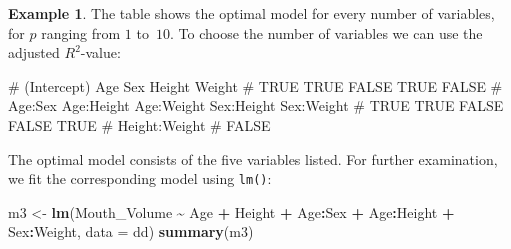 \documentclass[
  a4paper,
]{article}
\newenvironment{Shaded}{\begin{snugshade}}{\end{snugshade}}
\newcommand{\AttributeTok}[1]{\textcolor[rgb]{0.13,0.29,0.53}{#1}}
\newcommand{\FunctionTok}[1]{\textcolor[rgb]{0.13,0.29,0.53}{\textbf{#1}}}
\newcommand{\NormalTok}[1]{#1}
\newcommand{\OtherTok}[1]{\textcolor[rgb]{0.56,0.35,0.01}{#1}}
\newcommand{\SpecialCharTok}[1]{\textcolor[rgb]{0.81,0.36,0.00}{\textbf{#1}}}
\theoremstyle{definition}
\theoremstyle{definition}
\newtheorem{example}{Example}[section]
\theoremstyle{definition}
\theoremstyle{definition}
\theoremstyle{remark}
\begin{document}
\begin{example}
The table shows the optimal model for every number of variables,
for \(p\) ranging from \(1\) to~\(10\). To choose the number of variables
we can use the adjusted \(R^2\)-value:

\begin{Shaded}
\end{Shaded}

\begin{Shaded}
\begin{Highlighting}[]
\NormalTok{\#   (Intercept)           Age           Sex        Height        Weight }
\NormalTok{\#          TRUE          TRUE         FALSE          TRUE         FALSE }
\NormalTok{\#       Age:Sex    Age:Height    Age:Weight    Sex:Height    Sex:Weight }
\NormalTok{\#          TRUE          TRUE         FALSE         FALSE          TRUE }
\NormalTok{\# Height:Weight }
\NormalTok{\#         FALSE}
\end{Highlighting}
\end{Shaded}

The optimal model consists of the five variables listed. For further
examination, we fit the corresponding model using \texttt{lm()}:

\begin{Shaded}
\begin{Highlighting}[]
\NormalTok{m3 }\OtherTok{\textless{}{-}} \FunctionTok{lm}\NormalTok{(Mouth\_Volume}
         \SpecialCharTok{\textasciitilde{}}\NormalTok{ Age }\SpecialCharTok{+}\NormalTok{ Height }\SpecialCharTok{+}\NormalTok{ Age}\SpecialCharTok{:}\NormalTok{Sex }\SpecialCharTok{+}\NormalTok{ Age}\SpecialCharTok{:}\NormalTok{Height }\SpecialCharTok{+}\NormalTok{ Sex}\SpecialCharTok{:}\NormalTok{Weight,}
         \AttributeTok{data =}\NormalTok{ dd)}
\FunctionTok{summary}\NormalTok{(m3)}
\end{Highlighting}
\end{Shaded}


\end{example}
\end{document}
